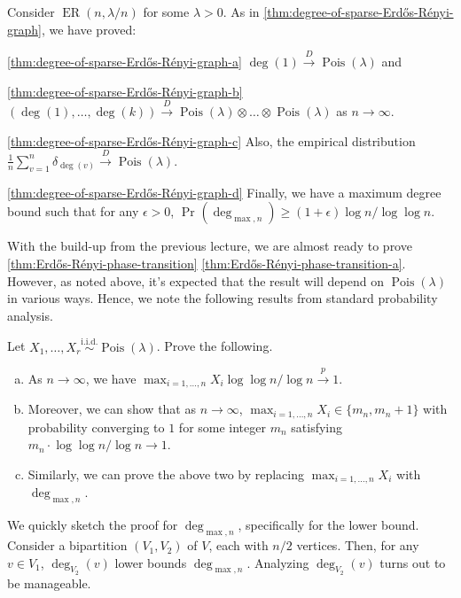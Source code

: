 \begin{prev}
	Consider \(\operatorname{ER}(n, \lambda / n) \) for some \(\lambda > 0\). As in \autoref{thm:degree-of-sparse-Erdős-Rényi-graph}, we have proved:
	\begin{enumerate*}
		\item[\autoref{thm:degree-of-sparse-Erdős-Rényi-graph-a}] \(\deg (1) \overset{D}{\to} \operatorname{Pois}(\lambda ) \) and
		\item[\autoref{thm:degree-of-sparse-Erdős-Rényi-graph-b}] \((\deg (1), \dots , \deg (k)) \overset{D}{\to} \operatorname{Pois}(\lambda ) \otimes \dots \otimes \operatorname{Pois}(\lambda ) \) as \(n \to \infty \).
		\item[\autoref{thm:degree-of-sparse-Erdős-Rényi-graph-c}] Also, the empirical distribution \(\frac{1}{n}\sum_{v=1}^{n} \delta _{\deg (v)} \overset{D}{\to} \operatorname{Pois}(\lambda ) \).
		\item[\autoref{thm:degree-of-sparse-Erdős-Rényi-graph-d}] Finally, we have a maximum degree bound such that for any \(\epsilon > 0\), \(\Pr_{}(\deg _{\max , n}) \geq (1 + \epsilon ) \log n / \log \log n \).
	\end{enumerate*}
\end{prev}

With the build-up from the previous lecture, we are almost ready to prove \autoref{thm:Erdős-Rényi-phase-transition} \autoref{thm:Erdős-Rényi-phase-transition-a}. However, as noted above, it's expected that the result will depend on \(\operatorname{Pois}(\lambda ) \) in various ways. Hence, we note the following results from standard probability analysis.

\begin{exercise}
	Let \(X_1, \dots , X_r \overset{\text{i.i.d.} }{\sim } \operatorname{Pois}(\lambda ) \). Prove the following.
	\begin{enumerate}[(a)]
		\item As \(n \to \infty \), we have \(\max _{i = 1, \dots , n} X_i \log \log n / \log n \overset{p}{\to} 1\).
		\item Moreover, we can show that as \(n \to \infty \), \(\max _{i = 1, \dots , n} X_i \in \{ m_n, m_n + 1 \}\) with probability converging to \(1\) for some integer \(m_n\) satisfying \(m_n \cdot \log \log n / \log n \to 1\).
		\item Similarly, we can prove the above two by replacing \(\max _{i = 1, \dots , n} X_i\) with \(\deg _{\max , n}\).
	\end{enumerate}
\end{exercise}
\begin{answer}
	We quickly sketch the proof for \(\deg _{\max , n}\), specifically for the lower bound. Consider a bipartition \((V_1, V_2)\) of \(V\), each with \(n / 2\) vertices. Then, for any \(v \in V_1\), \(\deg _{V_2}(v)\) lower bounds \(\deg _{\max , n}\). Analyzing \(\deg _{V_2}(v)\) turns out to be manageable.
\end{answer}

